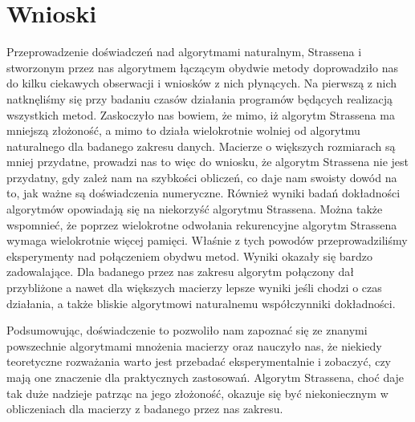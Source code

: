 \section{Wnioski}
Przeprowadzenie doświadczeń nad algorytmami naturalnym, Strassena i stworzonym
przez nas algorytmem łączącym obydwie metody doprowadziło nas do kilku ciekawych obserwacji
i wniosków z nich płynących. Na pierwszą z nich natknęliśmy się przy badaniu czasów działania
programów będących realizacją wszystkich metod. Zaskoczyło nas bowiem, że mimo, iż
algorytm Strassena ma mniejszą złożoność, a mimo to działa wielokrotnie wolniej od algorytmu
naturalnego dla badanego zakresu danych. Macierze o większych rozmiarach są mniej przydatne,
prowadzi nas to więc do wniosku, że algorytm Strassena nie jest przydatny, gdy zależ nam
na szybkości obliczeń, co daje nam swoisty dowód na to, jak ważne są doświadczenia numeryczne.
Również wyniki badań dokładności algorytmów opowiadają się na niekorzyść algorytmu Strassena.
Można także wspomnieć, że poprzez wielokrotne odwołania rekurencyjne algorytm Strassena
wymaga wielokrotnie więcej pamięci. Właśnie z tych powodów przeprowadziliśmy eksperymenty nad połączeniem
obydwu metod. Wyniki okazały się bardzo zadowalające. Dla badanego przez nas zakresu algorytm połączony dał przybliżone
a nawet dla większych macierzy lepsze wyniki jeśli chodzi o czas działania, a także bliskie algorytmowi
naturalnemu współczynniki dokładności.

Podsumowując, doświadczenie to pozwoliło nam zapoznać się ze znanymi powszechnie algorytmami
mnożenia macierzy oraz nauczyło nas, że niekiedy teoretyczne rozważania warto jest przebadać
eksperymentalnie i zobaczyć, czy mają one znaczenie dla praktycznych zastosowań. Algorytm Strassena,
choć daje tak duże nadzieje patrząc na jego złożoność, okazuje się być niekoniecznym w obliczeniach dla
macierzy z badanego przez nas zakresu.
